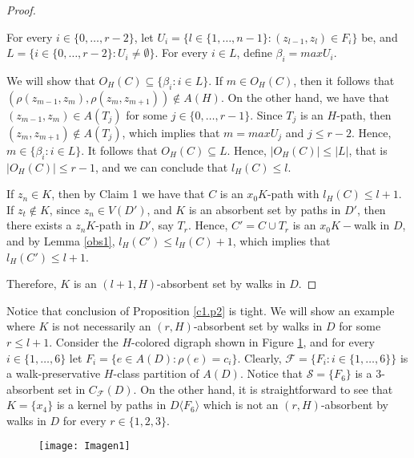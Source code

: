 \documentclass[10pt,a4paper]{article}
\begin{document}
\begin{proof}
\begin{description}
For every $i \in \{ 0, \ldots , r - 2 \}$, let $U_{i}=\{ l \in \{ 1, \ldots , n-1 \} : (z_{l-1}, z_{l}) \in F_{i} \}$ be, and $L = \{ i \in \{ 0, \ldots , r-2 \} : U_{i} \neq \emptyset \}$. For every $i \in L$, define $\beta_{i} = max U_{i}$. 
 
We will show that  $O_{H}(C) \subseteq \{ \beta_{i} : i \in L \}$.  If $m \in O_{H}(C)$, then it follows that $(\rho (z_{m-1}, z_{m}), \rho (z_{m}, z_{m+1}) ) \notin A(H)$. On the other hand, we have that $(z_{m-1}, z_{m} ) \in A(T_{j})$ for some $j \in \{ 0, \ldots , r-1 \}$.  Since $T_{j}$ is an $H$-path, then $(z_{m}, z_{m+1}) \notin A(T_{j})$, which implies that $m = max U_{j}$ and $j \leq r-2$. Hence, $m \in \{\beta_{i} : i \in L \}$. It follows that $O_{H}(C) \subseteq L$. Hence, $|O_{H}(C)| \leq |L|$, that is $|O_{H}(C)| \leq r-1$, and we can conclude that $l_{H}(C) \leq l$.
\end{description} 
 
If $z_{n} \in K$, then by Claim 1 we have that $C$ is an $x_{0}K$-path with $l_{H}(C) \leq l +1$. If $z_{t} \notin K$, since $z_{n} \in V(D')$, and $K$ is an absorbent set by paths in $D'$, then there exists a $z_{n}K$-path in $D'$, say $T_{r}$. Hence, $C' = C \cup T_{r}$ is an $x_{0}K-$walk in $D$, and by Lemma \ref{obs1}, $l_{H}(C') \leq l_{H}(C) + 1$, which implies that $l_{H}(C') \leq l + 1$. 

Therefore, $K$ is an $(l+1, H)$-absorbent set by walks in $D$.
\end{proof}

Notice that conclusion of Proposition \ref{c1.p2} is tight. We will show an example where $K$ is not necessarily an $(r,H)$-absorbent set by walks in $D$ for some $r\leq l+1$. Consider the $H$-colored digraph shown in Figure \ref{figure1}, and for every $i \in \{1, \ldots , 6 \}$ let $F_{i}=\{ e \in A(D): \rho (e)= c_{i} \}$. Clearly, $\mathscr{F}=\{ F_{i} : i \in \{ 1, \ldots , 6 \}\}$ is a walk-preservative $H$-class partition of $A(D)$. Notice that $\mathcal{S}=\{F_{6}\}$ is a $3$-absorbent set in $C_{\mathscr{F}}(D)$. On the other hand, it is straightforward to see that $K=\{ x_{4} \}$ is a kernel by paths in $D\langle F_{6} \rangle$ which is not an $(r,H)$-absorbent by walks in $D$ for every $r \in \{ 1,2,3 \}$.

\begin{figure}[ht]
\centering
\texttt{[image: Imagen1]}
\caption{\label{figure1}}
\end{figure}
\end{document}

